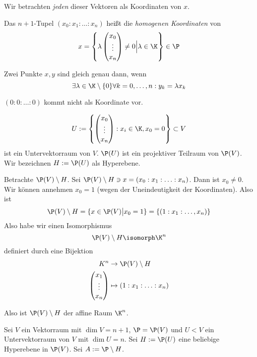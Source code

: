 \documentclass{mycourse}
\begin{document}
Wir betrachten \emph{jeden} dieser Vektoren als Koordinaten von $x$.

\begin{df}
	\label{df:15.5}
	Das $n+1$-Tupel $(x_0:x_1:\dotsc: x_n)$ heißt die \emph{homogenen Koordinaten} von
	\[
		x = \left\{ \lambda \begin{pmatrix}x_0\\\vdots \\ x_n\end{pmatrix}\neq 0 \Big| \lambda \in \K\right\} \in \P
	\]

	Zwei Punkte $x,y$ sind gleich genau dann, wenn
	\[
		\exists \lambda\in \K\setminus\{0\} \forall k=0,\dotsc,n : y_k = \lambda x_k
	\]
	\begin{note}
		$(0:0:\dotsc:0)$ kommt nicht als Koordinate vor.
	\end{note}
\end{df}

\[
U := \left\{ \begin{pmatrix}x_0\\\vdots\\x_n\end{pmatrix}: x_i \in\K, x_0=0\right\} \subset V
\]
ist ein Untervektorraum von $V$.
$\P(U)$ ist ein projektiver Teilraum von $\P(V)$.
Wir bezeichnen $H:= \P(U)$ als Hyperebene.

Betrachte $\P(V) \setminus H$.
Sei $\P(V) \setminus H \ni x = (x_0:x_1:\dotsc:x_n)$.
Dann ist $x_0\neq 0$.
Wir können annehmen $x_0=1$ (wegen der Uneindeutigkeit der Koordinaten).
Also ist
\[
	\P(V) \setminus H = \{ x\in \P(V) \big| x_0 = 1\} = \{ (1:x_1:\dotsc, x_n) \}
\]
Also habe wir einen Isomorphismus
\[
	\P(V) \setminus H \isomorph \K^n
\]
definiert durch eine Bijektion
\begin{align*}
	K^n &\to \P(V) \setminus H\\
\begin{pmatrix}x_1\\\vdots\\ x_n\end{pmatrix} &\mapsto (1:x_1:\dotsc:x_n)
\end{align*}

Also ist $\P(V) \setminus H$ der affine Raum $\K^n$.
		

Sei $V$ ein Vektorraum mit $\dim V=n+1$, $\P = \P(V)$ und $U < V$ ein Untervektorraum von $V$ mit $\dim U =n$.
Sei $H := \P(U)$ eine beliebige Hyperebene in $\P(V)$.
Sei $A := \P \setminus H$.
\end{document}
